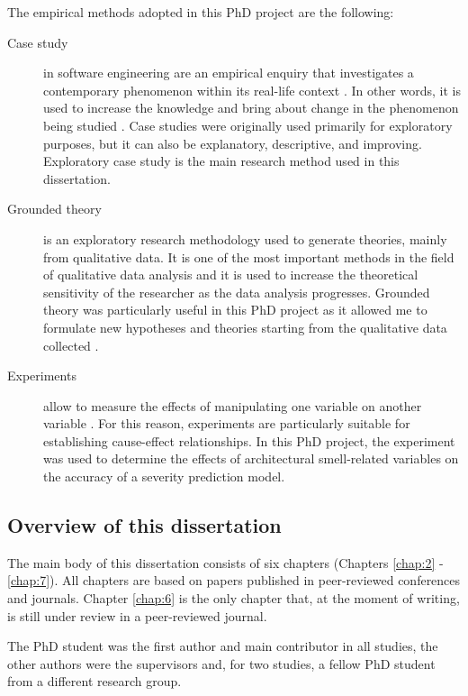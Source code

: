 The empirical methods adopted in this PhD project are the following:
\begin{description}
    \item[Case study] in software engineering are an empirical enquiry that investigates a contemporary phenomenon within its real-life context \cite{Yin2003}. In other words, it is used to increase the knowledge and bring about change in the phenomenon being studied \cite{Runeson2012}. Case studies were originally used primarily for exploratory purposes, but it can also be explanatory, descriptive, and improving.
    Exploratory case study is the main research method used in this dissertation.
    
    \item[Grounded theory] is an exploratory research methodology used to generate theories, mainly from qualitative data. It is one of the most important methods in the field of qualitative data analysis and it is used to increase the theoretical sensitivity of the researcher as the data analysis progresses. Grounded theory was particularly useful in this PhD project as it allowed me to formulate new hypotheses and theories starting from the qualitative data collected \cite{Glaser1968}.
    
    \item[Experiments] allow to measure the effects of manipulating one variable on another variable \cite{Runeson2012}. For this reason, experiments are particularly suitable for establishing cause-effect relationships.
    In this PhD project, the experiment was used to determine the effects of architectural smell-related variables on the accuracy of a severity prediction model.
    
\end{description}

\subsection{Overview of this dissertation}
The main body of this dissertation consists of six chapters (Chapters \ref{chap:2} - \ref{chap:7}).
All chapters are based on papers published in peer-reviewed conferences and journals.
Chapter \ref{chap:6} is the only chapter that, at the moment of writing, is still under review in a peer-reviewed journal.

The PhD student was the first author and main contributor in all studies, the other authors were the supervisors and, for two studies, a fellow PhD student from a different research group.


